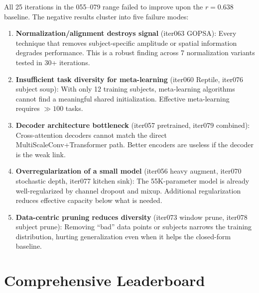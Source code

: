 \documentclass[11pt,a4paper]{article}
\begin{document}
All 25 iterations in the 055--079 range failed to improve upon the
$r = 0.638$ baseline. The negative results cluster into five failure modes:

\begin{enumerate}
  \item \textbf{Normalization/alignment destroys signal} (iter063 GOPSA):
    Every technique that removes subject-specific amplitude or spatial
    information degrades performance. This is a robust finding across 7
    normalization variants tested in 30+ iterations.

  \item \textbf{Insufficient task diversity for meta-learning} (iter060
    Reptile, iter076 subject soup): With only 12 training subjects,
    meta-learning algorithms cannot find a meaningful shared initialization.
    Effective meta-learning requires $\gg 100$ tasks.

  \item \textbf{Decoder architecture bottleneck} (iter057 pretrained,
    iter079 combined): Cross-attention decoders cannot match the direct
    MultiScaleConv+Transformer path. Better encoders are useless if the
    decoder is the weak link.

  \item \textbf{Overregularization of a small model} (iter056 heavy
    augment, iter070 stochastic depth, iter077 kitchen sink): The 55K-parameter
    model is already well-regularized by channel dropout and mixup.
    Additional regularization reduces effective capacity below what is
    needed.

  \item \textbf{Data-centric pruning reduces diversity} (iter073 window
    prune, iter078 subject prune): Removing ``bad'' data points or subjects
    narrows the training distribution, hurting generalization even when it
    helps the closed-form baseline.
\end{enumerate}

\section{Comprehensive Leaderboard}
\label{sec:leaderboard}
\end{document}
